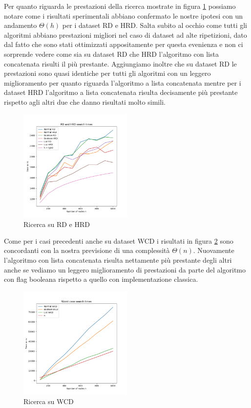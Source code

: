 Per quanto riguarda le prestazioni della ricerca mostrate in figura \ref{fig:RDHRDsearch} possiamo notare come i risultati sperimentali abbiano confermato le nostre
ipotesi con un andamento $\Theta(h)$ per i dataset RD e HRD.
Salta subito al occhio come tutti gli algoritmi abbiano prestazioni migliori nel caso di dataset ad alte ripetizioni, dato dal fatto che sono stati ottimizzati 
appositamente per questa evenienza e non ci sorprende vedere come sia su dataset RD che HRD l'algoritmo con lista concatenata risulti il più prestante.
Aggiungiamo inoltre che su dataset RD le prestazioni sono quasi identiche per tutti gli algoritmi con un leggero miglioramento per quanto riguarda l'algoritmo
a lista concatenata mentre per i dataset HRD l'algoritmo a lista concatenata risulta decisamente più prestante rispetto agli altri due che danno risultati molto simili.

\begin{figure}[H]
  \centering
  \includegraphics[width=0.5\textwidth]{Resources/ABR_Resources/RDeHRDsearch.png}
  \caption{Ricerca su RD e HRD}
  \label{fig:RDHRDsearch}
\end{figure}

Come per i casi precedenti anche su dataset WCD i risultati in figura \ref{fig:wdcsearch} sono concordanti con la nostra previsione di una complessità $\Theta(n)$.
Nuovamente l'algoritmo con lista concatenata risulta nettamente più prestante degli altri anche se vediamo un leggero miglioramento di prestazioni da parte 
del algoritmo con flag booleana rispetto a quello con implementazione classica.
\begin{figure}[H]
  \centering
  \includegraphics[width=0.5\textwidth]{Resources/ABR_Resources/WDsearch.png}
  \caption{Ricerca su WCD}
  \label{fig:wdcsearch}
\end{figure}

